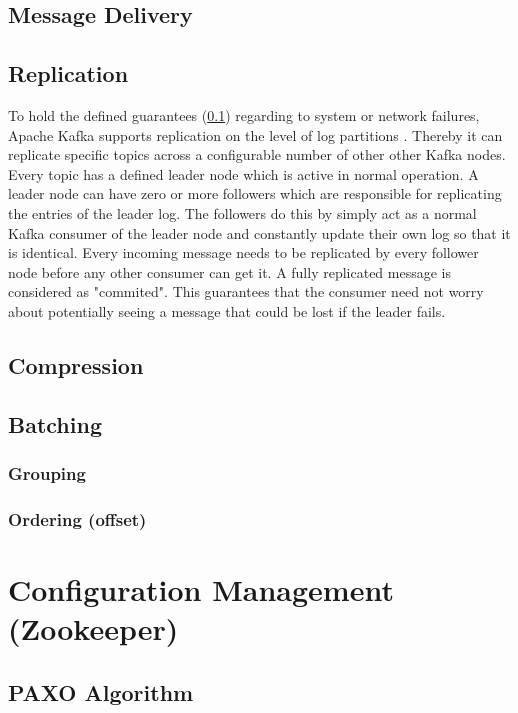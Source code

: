 \subsection{Message Delivery}
\label{kafka-message-delivery}
\subsection{Replication}
To hold the defined guarantees (\ref{kafka-message-delivery}) regarding to system
or network failures, Apache Kafka supports \gls{replication} on the level of log
partitions . Thereby it can replicate specific topics across a configurable
number of other other Kafka nodes. Every topic has a defined leader node which
is active in normal operation. A leader node can have zero or more followers
which are responsible for replicating the entries of the leader log. The followers
do this by simply act as a normal Kafka consumer of the leader node and
constantly update their own log so that it is identical. Every incoming message
needs to be replicated by every follower node before any other consumer can get
it. A fully replicated message is considered as "commited". This guarantees that
the consumer need not worry about potentially seeing a message that could be
lost if the leader fails. \cite{apachekafka}



\subsection{Compression}

\subsection{Batching}



\subsubsection{Grouping}

\subsubsection{Ordering (offset)}

\section{Configuration Management (Zookeeper)}
\subsection{PAXO Algorithm}
